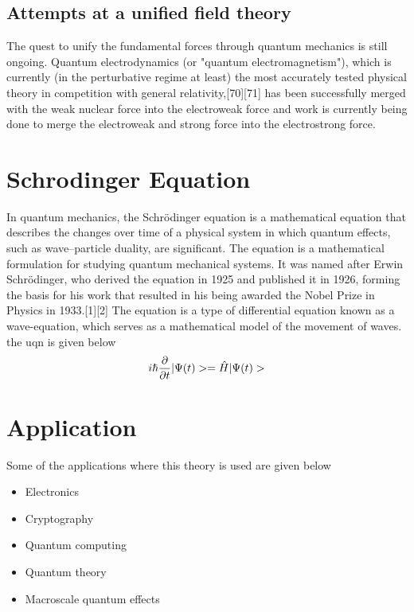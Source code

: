 \documentclass{article}
\begin{document}
\subsection{Attempts at a unified field theory}
The quest to unify the fundamental forces through quantum mechanics is still ongoing. Quantum electrodynamics (or "quantum electromagnetism"), which is currently (in the perturbative regime at least) the most accurately tested physical theory in competition with general relativity,[70][71] has been successfully merged with the weak nuclear force into the electroweak force and work is currently being done to merge the electroweak and strong force into the electrostrong force. 

\section{Schrodinger Equation}

In quantum mechanics, the Schrödinger equation is a mathematical equation that describes the changes over time of a physical system in which quantum effects, such as wave–particle duality, are significant. The equation is a mathematical formulation for studying quantum mechanical systems. It was named after Erwin Schrödinger, who derived the equation in 1925 and published it in 1926, forming the basis for his work that resulted in his being awarded the Nobel Prize in Physics in 1933.[1][2] The equation is a type of differential equation known as a wave-equation, which serves as a mathematical model of the movement of waves.
the uqn is given below
\begin{equation}
    
i\hslash \dfrac{\partial}{\partial t}|\Psi(t)>=\Hat{H}|\Psi(t)>

\end{equation}


\section{Application}
 Some of the applications where this theory is used  are given below 

\begin{itemize}
    \item Electronics
    \item Cryptography
    \item Quantum computing
    \item Quantum theory
    \item Macroscale quantum effects
\end{itemize}
\end{document}
